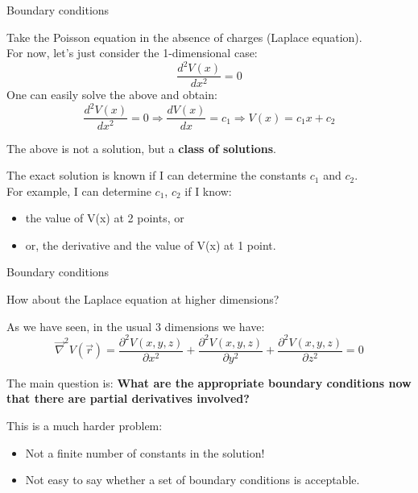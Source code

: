 \begin{frame}{Boundary conditions}

Take the Poisson equation in the absence of charges (Laplace equation).\\
For now, let's just consider the 1-dimensional case:
\begin{equation*}
  \frac{d^{2}V(x)}{dx^2} = 0
\end{equation*}
One can easily solve the above and obtain:
\begin{equation*}
  \frac{d^{2}V(x)}{dx^2} = 0 \Rightarrow \frac{dV(x)}{dx} = c_{1} \Rightarrow V(x) = c_{1}x + c_{2}
\end{equation*}

The above is not a solution, but a {\bf class of solutions}.\\
\vspace{0.2cm}

The exact solution is known if I can determine the constants $c_1$ and $c_2$.\\
For example, I can determine $c_1$, $c_2$ if I know:
\begin{itemize}
  \item the value of V(x) at 2 points, or
  \item or, the derivative and the value of V(x) at 1 point.
\end{itemize}

\end{frame}


%
%
%

\begin{frame}{Boundary conditions}

How about the Laplace equation at higher dimensions?\\
\vspace{0.2cm}

As we have seen, in the usual 3 dimensions we have:
\begin{equation*}
  \vec{\nabla}^{2} V(\vec{r}) =
    \frac{\partial^{2}V(x,y,z)}{\partial x^2} +
    \frac{\partial^{2}V(x,y,z)}{\partial y^2} +
    \frac{\partial^{2}V(x,y,z)}{\partial z^2} = 0
\end{equation*}

The main question is:
{\bf What are the appropriate boundary conditions now that there are partial derivatives involved?}\\
\vspace{0.2cm}

This is a much harder problem:
\begin{itemize}
  \item Not a finite number of constants in the solution!
  \item Not easy to say whether a set of boundary conditions is acceptable.
\end{itemize}

\end{frame}



